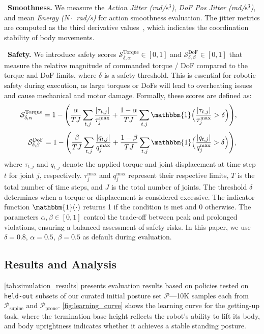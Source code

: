 \noindent \textbullet~\textbf{Smoothness.} We measure the \textit{Action Jitter (rad/$\text{s}^3$)}, \textit{DoF Pos Jitter (rad/$\text{s}^3$)}, and mean \textit{Energy ($N\cdot$ rad/s)} for action smoothness evaluation. The jitter metrics are computed as the third derivative values~\cite{JitterMeasurement85}, which indicates the coordination stability of body movements.

\noindent \textbullet~\textbf{Safety.} We introduce safety scores $\mathcal{S}^{\text{Torque}}_{\delta,\alpha} \in [0, 1]$ and $\mathcal{S}^{\text{DoF}}_{\delta,\beta}\in[0,1]$ that measure the relative magnitude of commanded torque / DoF compared to the torque and DoF limits, where $\delta$ is a safety threshold. This is essential for robotic safety during execution, as large torques or DoFs will lead to overheating issues and cause mechanical and motor damage. Formally, these scores are defined as:
\[
\begin{aligned}
\mathcal{S}^{\text{Torque}}_{\delta, \alpha} &= 1 - \Bigg( \frac{\alpha}{T J} \sum_{t,j} \frac{| \tau_{t, j} |}{\tau_j^{\max}} + \frac{1-\alpha}{TJ} \sum_{t,j} \mathbbm{1} \Big( \frac{| \tau_{t, j} |}{\tau_j^{\max}} > \delta \Big) \Bigg),
\end{aligned}
\]
\[
\mathcal{S}^{\text{DoF}}_{\delta,\beta} = 1 - \Bigg( \frac{\beta}{T J} \sum_{t,j} \frac{| q_{t, j} |}{q_j^{\max}} + \frac{1 - \beta}{TJ} \sum_{t,j} \mathbbm{1} \Big( \frac{| q_{t, j} |}{q_j^{\max}} > \delta \Big) \Bigg),
\]
where $\tau_{t, j}$ and $q_{t, j}$ denote the applied torque and joint displacement at time step $t$ for joint $j$, respectively. $\tau_j^{\max}$ and $q_j^{\max}$ represent their respective limits, $T$ is the total number of time steps, and $J$ is the total number of joints. The threshold $\delta$ determines when a torque or displacement is considered excessive. The indicator function $\mathbbm{1}(\cdot)$ returns 1 if the condition is met and 0 otherwise. The parameters $\alpha, \beta \in [0,1]$ control the trade-off between peak and prolonged violations, ensuring a balanced assessment of safety risks.
In this paper, we use $\delta=0.8$, $\alpha=0.5$, $\beta=0.5$ as default during evaluation.

\subsection{Results and Analysis}\label{sec:sim_res}
\cref{tab:simulation_results} presents evaluation results based on policies tested on \texttt{held-out} subsets of our curated initial posture set \(\mathcal{P}\)—10K samples each from \(\mathcal{P}_{\text{supine}}\) and \(\mathcal{P}_{\text{prone}}\). \cref{fig:learning_curve} shows the learning curve for the getting-up task, where the termination base height reflects the robot’s ability to lift its body, and body uprightness indicates whether it achieves a stable standing posture.


